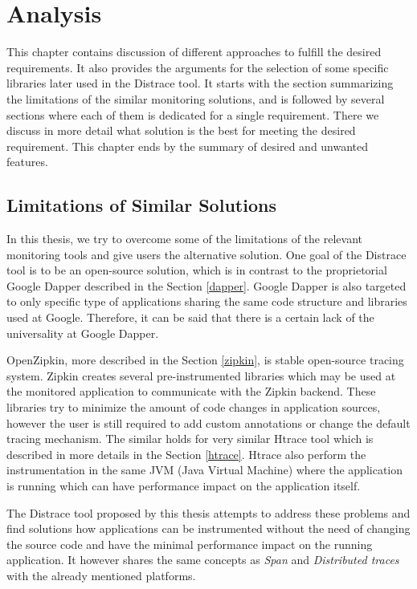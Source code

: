 \chapter{Analysis}
\label{analysis}
This chapter contains discussion of different approaches to fulfill the desired requirements. It also provides the arguments for the selection of some specific libraries later used in the Distrace tool. It starts with the section summarizing the limitations of the similar monitoring solutions, and is followed by several sections where each of them is dedicated for a single requirement. There we discuss in more detail what solution is the best for meeting the desired requirement. This chapter ends by the summary of desired and unwanted features.

\section{Limitations of Similar Solutions}
In this thesis, we try to overcome some of the limitations of the relevant monitoring tools and give users the alternative solution. One goal of the Distrace tool is to be an open-source solution, which is in contrast to the proprietorial Google Dapper described in the Section \ref{dapper}. Google Dapper is also targeted to only specific type of applications sharing the same code structure and libraries used at Google. Therefore, it can be said that there is a certain lack of the universality at Google Dapper. 

OpenZipkin, more described in the Section \ref{zipkin}, is stable open-source tracing system. Zipkin creates several pre-instrumented libraries which may be used at the monitored application to communicate with the Zipkin backend. These libraries try to minimize the amount of code changes in application sources, however the user is still required to add custom annotations or change the default tracing mechanism. The similar holds for very similar Htrace tool which is described in more details in the Section \ref{htrace}. Htrace also perform the instrumentation in the same JVM (Java Virtual Machine) where the application is running which can have performance impact on the application itself.

The Distrace tool proposed by this thesis attempts to address these problems and find solutions how applications can be instrumented without the need of changing the source code and have the minimal performance impact on the running application. It however shares the same concepts as \textit{Span} and\textit{ Distributed traces} with the already mentioned platforms.
